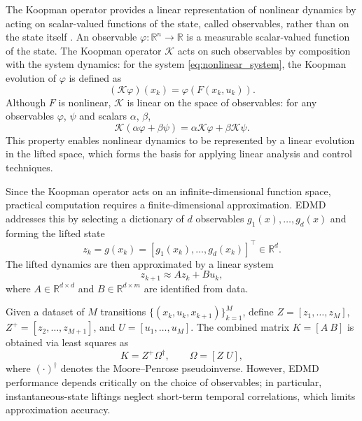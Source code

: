 \documentclass[journal]{IEEEtran}
\begin{document}
The Koopman operator provides a linear representation of nonlinear dynamics by acting on scalar-valued functions of the state, called observables, rather than on the state itself \cite{koopman1931hamiltonian, mezic2005spectral, rowley2009spectral, brunton2022modern}. An observable $\varphi:\mathbb{R}^n\to\mathbb{R}$ is a measurable scalar-valued function of the state. The Koopman operator $\mathcal{K}$ acts on such observables by composition with the system dynamics: for the system \eqref{eq:nonlinear_system}, the Koopman evolution of $\varphi$ is defined as
\begin{equation}
    (\mathcal{K}\varphi)(x_k) = \varphi(F(x_k,u_k)).
    \label{eq:koopman_operator}
\end{equation}
Although $F$ is nonlinear, $\mathcal{K}$ is linear on the space of observables: for any observables $\varphi$, $\psi$ and scalars $\alpha$, $\beta$,
\begin{equation}
    \mathcal{K}(\alpha \varphi + \beta \psi)
    = \alpha \mathcal{K}\varphi + \beta \mathcal{K}\psi.
    \label{eq:koopman_linearity}
\end{equation}
This property enables nonlinear dynamics to be represented by a linear evolution in the lifted space, which forms the basis for applying linear analysis and control techniques.

Since the Koopman operator acts on an infinite-dimensional function space, practical computation requires a finite-dimensional approximation. EDMD addresses this by selecting a dictionary of $d$ observables $g_1(x),\ldots,g_d(x)$ and forming the lifted state
\begin{equation}
    z_k = g(x_k) = [g_1(x_k), \ldots, g_d(x_k)]^\top \in \mathbb{R}^d.
    \label{eq:instantaneous_lifting}
\end{equation}
The lifted dynamics are then approximated by a linear system
\begin{equation}
    z_{k+1} \approx A z_k + B u_k,
    \label{eq:edmd_dynamics}
\end{equation}
where $A \in \mathbb{R}^{d \times d}$ and $B \in \mathbb{R}^{d \times m}$ are identified from data.

Given a dataset of $M$ transitions $\{(x_k, u_k, x_{k+1})\}_{k=1}^M$, define $Z = [z_1,\ldots,z_M]$, $Z^+ = [z_2,\ldots,z_{M+1}]$, and $U = [u_1,\ldots,u_M]$. The combined matrix $K = [A\ B]$ is obtained via least squares as
\begin{equation}
    K = Z^+ \Omega^\dagger, \qquad \Omega = [Z\; U],
    \label{eq:edmd_regression}
\end{equation}
where $(\cdot)^\dagger$ denotes the Moore--Penrose pseudoinverse. However, EDMD performance depends critically on the choice of observables; in particular, instantaneous-state liftings neglect short-term temporal correlations, which limits approximation accuracy.
\end{document}
